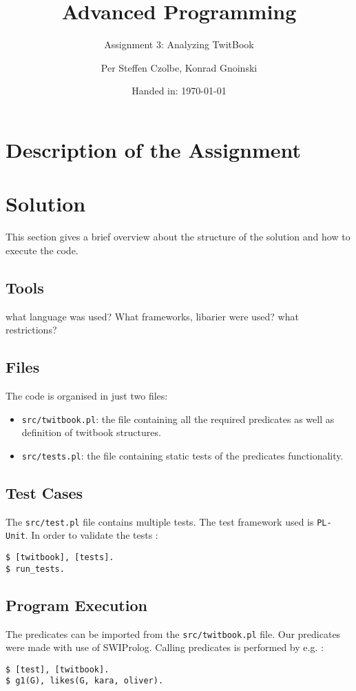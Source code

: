 \documentclass[11pt, a4paper]{article}
\author{Per Steffen Czolbe, Konrad Gnoinski}
\title{Advanced Programming}
\subtitle{Assignment 3: Analyzing TwitBook} %
\date{Handed in: \today}
\begin{document}
\maketitle

\tableofcontents


\section{Description of the Assignment}

\section{Solution}
This section gives a brief overview about the structure of the solution and how to execute the code.

\subsection{Tools}
what language was used? What frameworks, libarier were used? what restrictions?

\subsection{Files}
The code is organised in just two files:
\begin{itemize}
	\item \texttt{src/twitbook.pl}: the file containing all the required predicates as well as definition of twitbook structures. 
	\item \texttt{src/tests.pl}: the file containing static tests of the predicates functionality.
\end{itemize}

\subsection{Test Cases}
The \texttt{src/test.pl} file contains multiple tests. The test framework used is \texttt{PL-Unit}. In order to validate the tests :
\begin{lstlisting}[style=Bash]
$ [twitbook], [tests].
$ run_tests.
\end{lstlisting}

\subsection{Program Execution}
The predicates can be imported from the \texttt{src/twitbook.pl} file. Our predicates were made with use of SWIProlog. Calling predicates is performed by e.g. :
\begin{lstlisting}[style=Bash]
$ [test], [twitbook].
$ g1(G), likes(G, kara, oliver).
\end{lstlisting}
\end{document}
